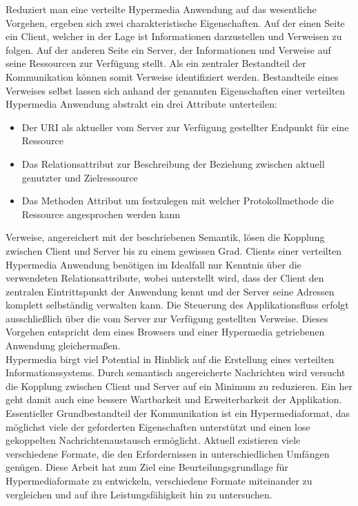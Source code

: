 Reduziert man eine verteilte Hypermedia Anwendung auf das wesentliche Vorgehen, ergeben sich zwei charakteristische Eigenschaften. Auf der einen Seite ein Client, welcher in der Lage ist Informationen darzustellen und Verweisen zu folgen. Auf der anderen Seite ein Server, der Informationen und Verweise auf seine Ressourcen zur Verfügung stellt. Als ein zentraler Bestandteil der Kommunikation können somit Verweise identifiziert werden. Bestandteile eines Verweises selbst lassen sich anhand der genannten Eigenschaften einer verteilten Hypermedia Anwendung abstrakt ein drei Attribute unterteilen:
\begin{itemize}
\item Der URI als aktueller vom Server zur Verfügung gestellter Endpunkt für eine Ressource
\item Das Relationsattribut zur Beschreibung der Beziehung zwischen aktuell genutzter und Zielressource
\item Das Methoden Attribut um festzulegen mit welcher Protokollmethode die Ressource angesprochen werden kann
\end{itemize}
Verweise, angereichert mit der beschriebenen Semantik, lösen die Kopplung zwischen Client und Server bis zu einem gewissen Grad. Clients einer verteilten Hypermedia Anwendung benötigen im Idealfall nur Kenntnis über die verwendeten Relationsattribute, wobei unterstellt wird, dass der Client den zentralen Eintrittspunkt der Anwendung kennt und der Server seine Adressen komplett selbständig verwalten kann. Die Steuerung des Applikationsfluss erfolgt ausschließlich über die vom Server zur Verfügung gestellten Verweise. Dieses Vorgehen entspricht dem eines Browsers und einer Hypermedia getriebenen Anwendung gleichermaßen.\\
Hypermedia birgt viel Potential in Hinblick auf die Erstellung eines verteilten Informationssystems. Durch semantisch angereicherte Nachrichten wird versucht die Kopplung zwischen Client und Server auf ein Minimum zu reduzieren. Ein her geht damit auch eine bessere Wartbarkeit und Erweiterbarkeit der Applikation. Essentieller Grundbestandteil der Kommunikation ist ein Hypermediaformat, das möglichst viele der geforderten Eigenschaften unterstützt und einen lose gekoppelten Nachrichtenaustausch ermöglicht. Aktuell existieren viele verschiedene Formate, die den Erfordernissen in unterschiedlichen Umfängen genügen. Diese Arbeit hat zum Ziel eine Beurteilungsgrundlage für Hypermediaformate zu entwickeln, verschiedene Formate miteinander zu vergleichen und auf ihre Leistungsfähigkeit hin zu untersuchen.











